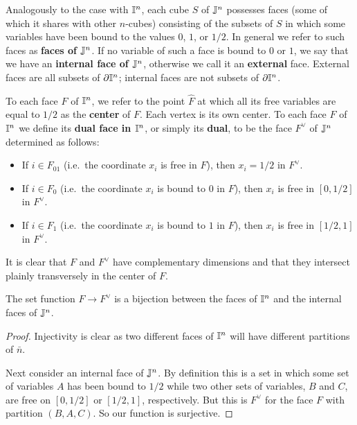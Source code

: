 Analogously to the case with $\mathbb{I}^n$, each cube $S$ of $\mathbb{J}^n$ possesses faces (some of which it shares with other $n$-cubes) consisting of the subsets of $S$ in which some variables have been bound to the values $0$, $1$, or $1/2$. In general we refer to such faces as \textbf{faces of $\mathbb{J}^n$}. If no variable of such a face is bound to $0$ or $1$, we say that we have an \textbf{internal face of $\mathbb{J}^n$}, otherwise we call it an \textbf{external} face. External faces are all subsets of $\partial \mathbb{I}^n$; internal faces are not subsets of $\partial \mathbb{I}^n$.

To each face $F$ of $\mathbb{I}^n$, we refer to the point $\hat F$ at which all its free variables are equal to $1/2$ as the \textbf{center} of $F$. Each vertex is its own center. To each face $F$ of $\mathbb{I}^n$ we define its \textbf{dual face in $\mathbb{I}^n$}, or simply its \textbf{dual}, to be the face $F^\vee$ of $\mathbb{J}^n$ determined as follows:
\begin{itemize}
\item If $i\in F_{01}$ (i.e.\ the coordinate $x_i$ is free in $F$), then $x_i=1/2$ in $F^\vee$.

\item If $i\in F_0$ (i.e.\ the coordinate $x_i$ is bound to $0$ in $F$), then $x_i$ is free in $[0,1/2]$ in $F^\vee$.

\item If $i\in F_1$ (i.e.\ the coordinate $x_i$ is bound to $1$ in $F$), then $x_i$ is free in $[1/2,1]$ in $F^\vee$.
\end{itemize}

It is clear that $F$ and $F^\vee$ have complementary dimensions and that they intersect plainly transversely in the center of $F$.

\begin{lemma}
The set function $F\to F^\vee$ is a bijection between the faces of $\mathbb{I}^n$ and the internal faces of $\mathbb{J}^n$.
\end{lemma}
\begin{proof}
Injectivity is clear as two different faces of $\mathbb{I}^n$ will have different partitions of $\bar n$.

Next consider an internal face of $\mathbb{J}^n$. By definition this is a set in which some set of variables $A$ has  been bound to $1/2$ while two other sets of variables, $B$ and $C$, are free on $[0,1/2]$ or $[1/2,1]$, respectively. But this is $F^\vee$ for the face $F$ with partition $(B,A,C)$. So our function is surjective.
\end{proof}

